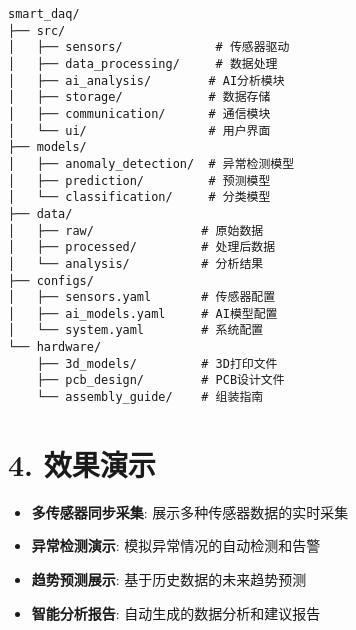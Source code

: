 \begin{lstlisting}
smart_daq/
├── src/
│   ├── sensors/             # 传感器驱动
│   ├── data_processing/     # 数据处理
│   ├── ai_analysis/        # AI分析模块
│   ├── storage/            # 数据存储
│   ├── communication/      # 通信模块
│   └── ui/                 # 用户界面
├── models/
│   ├── anomaly_detection/  # 异常检测模型
│   ├── prediction/         # 预测模型
│   └── classification/     # 分类模型
├── data/
│   ├── raw/               # 原始数据
│   ├── processed/         # 处理后数据
│   └── analysis/          # 分析结果
├── configs/
│   ├── sensors.yaml       # 传感器配置
│   ├── ai_models.yaml     # AI模型配置
│   └── system.yaml        # 系统配置
└── hardware/
    ├── 3d_models/         # 3D打印文件
    ├── pcb_design/        # PCB设计文件
    └── assembly_guide/    # 组装指南
\end{lstlisting}

\section{4. 效果演示}\label{ux6548ux679cux6f14ux793a}

\begin{itemize}
\tightlist
\item
  \textbf{多传感器同步采集}: 展示多种传感器数据的实时采集
\item
  \textbf{异常检测演示}: 模拟异常情况的自动检测和告警
\item
  \textbf{趋势预测展示}: 基于历史数据的未来趋势预测
\item
  \textbf{智能分析报告}: 自动生成的数据分析和建议报告
\end{itemize}
